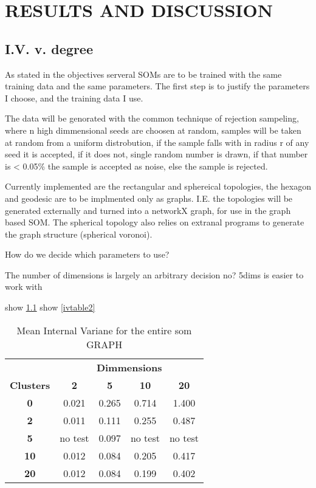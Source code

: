 \chapter{RESULTS AND DISCUSSION}



\section{I.V. v. degree}

As stated in the objectives serveral SOMs are to be trained with the same
training data and the same parameters.  The first step is to justify the
parameters I choose, and the training data I use.

The data will be genorated with the common technique of rejection sampeling,
where n high dimmensional seeds are choosen at random, samples will be taken
at random from a uniform distrobution, if the sample falls with in radius r of
any seed it is accepted, if it does not, single random number is drawn, if that
number is < 0.05\% the sample is accepted as noise, else the sample is rejected.

Currently implemented are the rectangular and sphereical topologies, the hexagon
and geodesic are to be implmented only as graphs.  I.E. the topologies will be
generated externally and turned into a networkX graph, for use in the graph
based SOM. The spherical topology also relies on extranal programs to generate
the graph structure (spherical voronoi).

How do we decide which parameters to use?

The number of dimensions is largely an arbitrary decision no?
5dims is easier to work with

show \ref{ivtable1}
show \ref{ivtable2}


\begin{table}
\caption{Mean Internal Variane for the entire som GRAPH}
\label{ivtable1}
\begin{tabular}{|c||c|c|c|c|}
\hline
&\multicolumn{4}{c|}{\textbf{Dimmensions}}\\
\textbf{Clusters} & \multicolumn{1}{c}{\textbf{2}} &
\multicolumn{1}{c}{\textbf{5}} & \multicolumn{1}{c}{\textbf{10}} &
\multicolumn{1}{c|}{\textbf{20}}\\
\hline
\hline
\textbf{0} & 0.021& 0.265& 0.714& 1.400 \\
\hline
\textbf{2} & 0.011& 0.111& 0.255& 0.487 \\
\hline
\textbf{5} & no test& 0.097& no test& no test \\
\hline
\textbf{10} & 0.012& 0.084& 0.205& 0.417 \\
\hline
\textbf{20} & 0.012& 0.084& 0.199& 0.402 \\
\hline
\end{tabular} \end{table}



